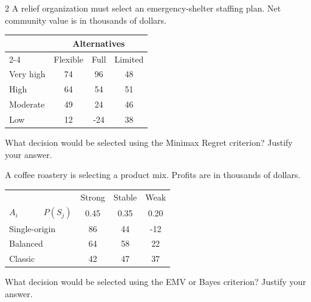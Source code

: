 \begin{multicols}{2}
		A relief organization must select an emergency-shelter staffing plan. Net community value is in thousands of dollars.\vspace{-3mm}
		\begin{center}\setlength{\tabcolsep}{2pt}\renewcommand{\arraystretch}{1.1}
			\begin{tabular}{lccc}
				\toprule
				& \multicolumn{3}{c}{Alternatives} \\
				\cmidrule(lr){2-4}
				& Flexible & Full & Limited \\ \midrule
				Very high & 74 & 96 & 48 \\
				High      & 64 & 54 & 51 \\
				Moderate  & 49 & 24 & 46 \\
				Low       & 12 & -24 & 38 \\ \bottomrule
			\end{tabular}
			\end{center}\vspace{-3mm}
		What decision would be selected using the Minimax Regret criterion? Justify your answer.\vspace{-3mm}

		A coffee roastery is selecting a product mix. Profits are in thousands of dollars.\vspace{-3mm}
		\begin{center}\setlength{\tabcolsep}{2pt}\renewcommand{\arraystretch}{1.1}
			\begin{tabular}{lccc}\toprule
			&Strong&Stable&Weak\\
			$A_i \qquad \quad P(S_j)$&0.45&0.35&0.20\\ \midrule
			Single-origin&86&44&-12\\
			Balanced&64&58&22\\
			Classic&42&47&37\\ \bottomrule
			\end{tabular}
		\end{center}\vspace{-3mm}
		What decision would be selected using the EMV or Bayes criterion? Justify your answer.\vspace{-3mm}


\end{multicols}
